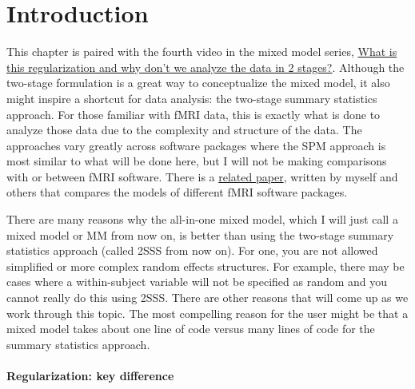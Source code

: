 \documentclass[
]{book}
\begin{document}
\hypertarget{introduction-2}{%
\section{Introduction}\label{introduction-2}}

This chapter is paired with the fourth video in the mixed model series, \href{https://youtu.be/sRhFeC-STdw}{What is this regularization and why don't we analyze the data in 2 stages?}. Although the two-stage formulation is a great way to conceptualize the mixed model, it also might inspire a shortcut for data analysis: the two-stage summary statistics approach. For those familiar with fMRI data, this is exactly what is done to analyze those data due to the complexity and structure of the data. The approaches vary greatly across software packages where the SPM approach is most similar to what will be done here, but I will not be making comparisons with or between fMRI software. There is a \href{https://www.ncbi.nlm.nih.gov/pubmed/19463958}{related paper}, written by myself and others that compares the models of different fMRI software packages.

There are many reasons why the all-in-one mixed model, which I will just call a mixed model or MM from now on, is better than using the two-stage summary statistics approach (called 2SSS from now on). For one, you are not allowed simplified or more complex random effects structures. For example, there may be cases where a within-subject variable will not be specified as random and you cannot really do this using 2SSS. There are other reasons that will come up as we work through this topic. The most compelling reason for the user might be that a mixed model takes about one line of code versus many lines of code for the summary statistics approach.

\hypertarget{regularization-key-difference}{%
\paragraph{Regularization: key difference}\label{regularization-key-difference}}
\end{document}
